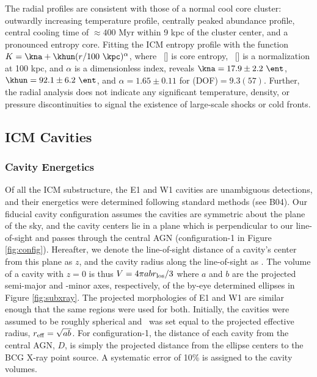 \documentclass[apjpt4]{aastex}
\begin{document}
The radial profiles are consistent with those of a normal cool core
cluster: outwardly increasing temperature profile, centrally peaked
abundance profile, central cooling time of $\approx 400$ Myr within 9
kpc of the cluster center, and a pronounced entropy core. Fitting the
ICM entropy profile with the function $K = \kna +\khun (r/100
~\kpc)^{\alpha}$, where \kna\ [\ent] is core entropy, \khun\ [\ent] is
a normalization at 100 kpc, and $\alpha$ is a dimensionless index,
reveals $\kna = 17.9 \pm 2.2 ~\ent$, $\khun = 92.1 \pm 6.2 ~\ent$, and
$\alpha = 1.65 \pm 0.11$ for \chisq(DOF)$ = 9.3(57)$. Further, the
radial analysis does not indicate any significant temperature,
density, or pressure discontinuities to signal the existence of
large-scale shocks or cold fronts.

\subsection{ICM Cavities}
\label{sec:cavities}

\subsubsection{Cavity Energetics}
\label{sec:ecav}

Of all the ICM substructure, the E1 and W1 cavities are unambiguous
detections, and their energetics were determined following standard
methods (see B04). Our fiducial cavity configuration assumes the
cavities are symmetric about the plane of the sky, and the cavity
centers lie in a plane which is perpendicular to our line-of-sight and
passes through the central AGN (configuration-1 in Figure
\ref{fig:config}). Hereafter, we denote the line-of-sight distance of
a cavity's center from this plane as $z$, and the cavity radius along
the line-of-sight as \rlos. The volume of a cavity with $z = 0$ is
thus $V = 4\pi a b r_{\rm{los}}/3$ where $a$ and $b$ are the projected
semi-major and -minor axes, respectively, of the by-eye determined
ellipses in Figure \ref{fig:subxray}. The projected morphologies of E1
and W1 are similar enough that the same regions were used for
both. Initially, the cavities were assumed to be roughly spherical and
\rlos\ was set equal to the projected effective radius, $r_{\rm{eff}} =
\sqrt{ab}$. For configuration-1, the distance of each cavity from the
central AGN, $D$, is simply the projected distance from the ellipse
centers to the BCG X-ray point source. A systematic error of 10\% is
assigned to the cavity volumes.
\end{document}
